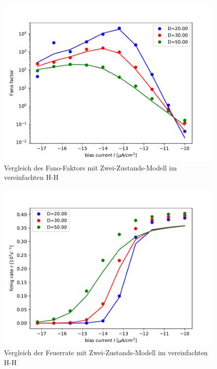 \documentclass[12pt,a4paper]{article}
\begin{document}
\begin{figure}[H]
	\centering
	\includegraphics[scale=1]{fcompdfpwnewrealrinzel25orealfast19jjem2st.pdf}\caption{Vergleich des Fano-Faktors mit Zwei-Zustands-Modell im vereinfachten H-H}
	\label{frinzelcomp}
\end{figure}
\begin{figure}[H]
	\centering
	\includegraphics[scale=1]{gcompdfpwnewrealrinzel25orealfast19jjem2st.pdf}\caption{Vergleich der Feuerrate mit Zwei-Zustands-Modell im vereinfachten H-H}
	\label{grinzelcomp}
\end{figure}
\end{document}
